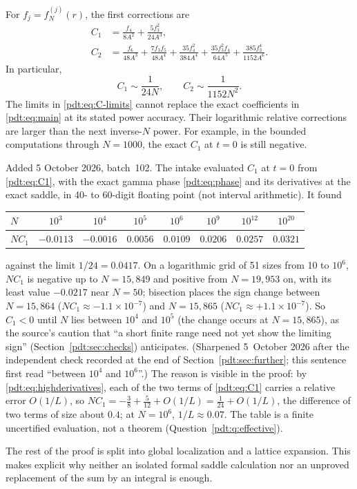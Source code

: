 For $f_j=f_N^{(j)}(r)$, the first corrections are
\begin{align}
 C_1&=\frac{f_4}{8A^2}+\frac{5f_3^2}{24A^3},\label{pdt:eq:C1}\\
 C_2&=\frac{f_6}{48A^3}+\frac{7f_3f_5}{48A^4}
       +\frac{35f_4^2}{384A^4}
       +\frac{35f_3^2f_4}{64A^5}
       +\frac{385f_3^4}{1152A^6}.\label{pdt:eq:C2}
\end{align}
In particular,
\begin{equation}\label{pdt:eq:C-limits}
 C_1\sim\frac1{24N},\qquad C_2\sim\frac1{1152N^2}.
\end{equation}
The limits in \eqref{pdt:eq:C-limits} cannot replace the exact coefficients in \eqref{pdt:eq:main} at its stated power accuracy. Their logarithmic relative corrections are larger than the next inverse-$N$ power. For example, in the bounded computations through $N=1000$, the exact $C_1$ at $t=0$ is still negative.

\begin{remark}\label{pdt:rem:C1sign}
Added 5 October 2026, batch~102. The intake evaluated $C_1$ at $t=0$ from
\eqref{pdt:eq:C1}, with the exact gamma phase \eqref{pdt:eq:phase} and its
derivatives at the exact saddle, in 40- to 60-digit floating point (not
interval arithmetic). It found
\begin{center}
\begin{tabular}{@{}lccccccc@{}}
\toprule
$N$ & $10^3$ & $10^4$ & $10^5$ & $10^6$ & $10^9$ & $10^{12}$ & $10^{20}$\\
\midrule
$NC_1$ & $-0.0113$ & $-0.0016$ & $0.0056$ & $0.0109$ & $0.0206$ & $0.0257$ & $0.0321$\\
\bottomrule
\end{tabular}
\end{center}
against the limit $1/24=0.0417$. On a logarithmic grid of 51 sizes from 10
to $10^6$, $NC_1$ is negative up to $N=15{,}849$ and positive from
$N=19{,}953$ on, with its least value $-0.0217$ near $N=50$; bisection
places the sign change between $N=15{,}864$ ($NC_1\approx-1.1\times10^{-7}$)
and $N=15{,}865$ ($NC_1\approx+1.1\times10^{-7}$). So $C_1<0$ until $N$ lies
between $10^4$ and $10^5$ (the change occurs at $N=15{,}865$), as the
source's caution that ``a short finite range need not yet show the
limiting sign'' (Section~\ref{pdt:sec:checks}) anticipates. (Sharpened
5~October 2026 after the independent check recorded at the end of
Section~\ref{pdt:sec:further}; this sentence first read ``between $10^4$
and $10^6$''.) The reason is visible in the proof:
by \eqref{pdt:eq:highderivatives}, each of the two terms of
\eqref{pdt:eq:C1} carries a relative error $O(1/L)$, so
$NC_1=-\frac38+\frac5{12}+O(1/L)=\frac1{24}+O(1/L)$, the difference of two
terms of size about $0.4$; at $N=10^6$, $1/L\approx0.07$. The table is a
finite uncertified evaluation, not a theorem
(Question~\ref{pdt:q:effective}).
\end{remark}

The rest of the proof is split into global localization and a lattice expansion. This makes explicit why neither an isolated formal saddle calculation nor an unproved replacement of the sum by an integral is enough.
